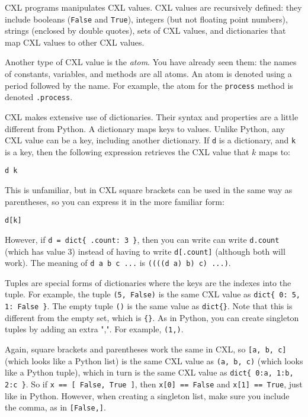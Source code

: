 \documentclass{report}
\newenvironment{code}{
\tcolorbox
}{
\endtcolorbox
}
\begin{document}
CXL programs manipulates CXL values.
CXL values are recursively defined:
they include booleans (\texttt{False} and \texttt{True}),
integers (but not floating point numbers),
strings (enclosed by double quotes),
sets of CXL values,
and dictionaries that map CXL values to other CXL values.

Another type of CXL value is the \emph{atom}.  You have already
seen them: the names of constants, variables, and methods are
all atoms.  An atom is denoted using a period followed by the
name.  For example, the atom for the \texttt{process} method
is denoted \texttt{.process}.

CXL makes extensive use of dictionaries.  Their syntax and properties
are a little different from Python.
A dictionary maps keys to values.
Unlike Python, any CXL value can be a key, including another
dictionary.
If \texttt{d} is a dictionary, and \texttt{k} is a key, then the
following expression retrieves the CXL value that $k$ maps to:
\begin{code}
\begin{verbatim}
d k
\end{verbatim}
\end{code}
This is unfamiliar, but in CXL square brackets can be used in the
same way as parentheses, so you can express it in the more familiar
form:
\begin{code}
\begin{verbatim}
d[k]
\end{verbatim}
\end{code}
However, if \texttt{d = dict\{ .count: 3 \}}, then you can write
can write \texttt{d.count} (which has value 3) instead of having to write
\texttt{d[.count]} (although both will work).
The meaning of \texttt{d a b c ...} is \texttt{((((d a) b) c) ...)}.

Tuples are special forms of dictionaries where the keys are
the indexes into the tuple.  For example, the tuple
\texttt{(5, False)} is the same CXL value as
\texttt{dict\{ 0: 5, 1: False \}}.
The empty tuple \texttt{()} is the same value as \texttt{dict\{\}}.
Note that this is different from the empty set, which is \texttt{\{\}}.
As in Python, you can create singleton tuples by adding an
extra ",". For example, \texttt{(1,)}.

Again, square brackets and parentheses work the same in CXL, so
\texttt{[a, b, c]} (which looks like a Python list)
is the same CXL value as \texttt{(a, b, c)} (which looks like a Python tuple),
which in turn is the same CXL value as \texttt{dict\{ 0:a, 1:b, 2:c \}}.
So if \texttt{x == [ False, True ]},
then \texttt{x[0] == False} and \texttt{x[1] == True}, just like in Python.
However, when creating a singleton list, make sure you include the
comma, as in \texttt{[False,]}.
\end{document}

